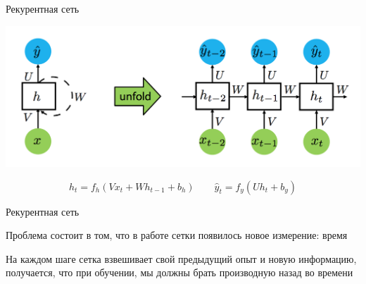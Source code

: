 \documentclass[notes,12pt, aspectratio=169]{beamer}
\newenvironment{wideitemize}{\itemize\addtolength{\itemsep}{10pt}}{\enditemize}
\begin{document}
\begin{frame}{Рекурентная сеть}
\begin{center}
	\includegraphics[width=.75\linewidth]{rnn.png}
\end{center}
\[
h_t = f_h( V x_t + W h_{t-1} + b_h) \qquad \hat y_t = f_y ( U h_t + b_y)
\]
\end{frame}



\begin{frame}{Рекурентная сеть}
\begin{wideitemize} 
	\item  \alert{Проблема} состоит в том, что в работе сетки появилось \alert{новое измерение: время} 
	
	\item На каждом шаге сетка взвешивает свой предыдущий опыт и новую информацию, получается, что при обучении, мы должны брать производную назад во времени
\end{wideitemize} 
\end{frame}
\end{document}
